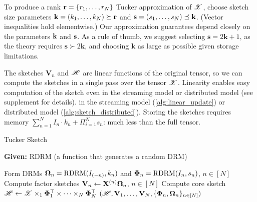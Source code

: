 To produce a rank $\mathbf{r} = \{r_1, \ldots, r_N\}$ Tucker approximation of $\T{X}$,
choose sketch size parameters $\mathbf{k} = (k_1, \dots, k_N) \succeq \mathbf{r}$
and $\mathbf{s} = (s_1, \dots, s_N) \preceq	 \mathbf{k}$.
(Vector inequalities hold elementwise.)
Our approximation guarantees depend closely on the parameters $\mathbf{k}$ and $\mathbf{s}$.
As a rule of thumb, we suggest selecting $\mathbf{s} = 2 \mathbf{k}+1$,
as the theory requires $\mathbf{s} \succ 2\mathbf{k}$,
and choosing $\mathbf{k}$ as large as possible given storage limitations.

The sketches $\mathbf{V}_n$ and $\T{H}$ are linear functions of the original tensor,
so we can compute the sketches in a single pass over the tensor $\T{X}$.
Linearity enables easy computation of the sketch even
\ifdefined \issupplement
in the streaming model or distributed model (see supplement for details).
\else
in the streaming model (\ref{alg:linear_update}) or distributed model (\ref{alg:sketch_distributed}).
\fi
Storing the sketches %
requires memory $\sum_{n=1}^N I_n\cdot k_n + \Pi_{i = 1}^N s_n $:
much less than the full tensor.


\begin{algorithm}[htb]
\caption{Tucker Sketch}\label{alg:tensor_sketch}
\textbf{Given:} RDRM (a function that generates a random DRM)
  \begin{algorithmic}[1]
  \State Form DRMs $\mathbf{\Omega}_n = \text{RDRM}(I_{(-n)}, k_n)$
  and $\mathbf{\Phi}_n = \text{RDRM}(I_n, s_n)$, $n \in [N]$
  \State Compute factor sketches $\mathbf{V}_n\leftarrow \mathbf{X}^{(n)}\mathbf{\Omega}_n $, $n \in [N]$
  \State Compute core sketch $\T{H} \leftarrow\T{X}\times_1 \mathbf{\Phi}_1^\top \times \dots \times_N  \mathbf{\Phi}_N^\top $
  \State \Return $(\T{H}, \mathbf{V}_1,\dots,\mathbf{V}_N, \{\M{\Phi}_n, \M{\Omega}_n\}_{n \in [N]})$
  \EndFunction
\end{algorithmic}
\end{algorithm}

